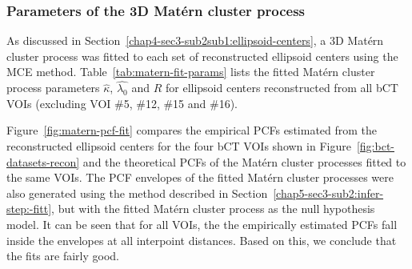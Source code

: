 \documentclass[journal]{IEEEtran}
\begin{document}
\subsubsection*{Parameters of the 3D Mat\'ern cluster process}
\label{chap4-sec4-sub2sub1:distr-reconstr-ellip}

As discussed in Section~\ref{chap4-sec3-sub2sub1:ellipsoid-centers}, a
3D Mat\'ern cluster process was fitted to each set of reconstructed
ellipsoid centers using the MCE
method. Table~\ref{tab:matern-fit-params} lists the fitted Mat\'ern
cluster process parameters $\hat{\kappa}$, $\hat{\lambda_0}$ and
$\hat{R}$ for ellipsoid centers reconstructed from all bCT VOIs
(excluding VOI \#5, \#12, \#15 and \#16).

Figure~\ref{fig:matern-pcf-fit} compares the empirical PCFs estimated
from the reconstructed ellipsoid centers for the four bCT VOIs shown
in Figure~\ref{fig:bct-datasets-recon} and the theoretical PCFs of the
Mat\'ern cluster processes fitted to the same VOIs. The PCF envelopes
of the fitted Mat\'ern cluster processes were also generated using the
method described in Section~\ref{chap5-sec3-sub2:infer-step:-fitt},
but with the fitted Mat\'ern cluster process as the null hypothesis
model. It can be seen that for all VOIs, the the empirically estimated
PCFs fall inside the envelopes at all interpoint distances. Based on
this, we conclude that the fits are fairly good.

\end{document}
